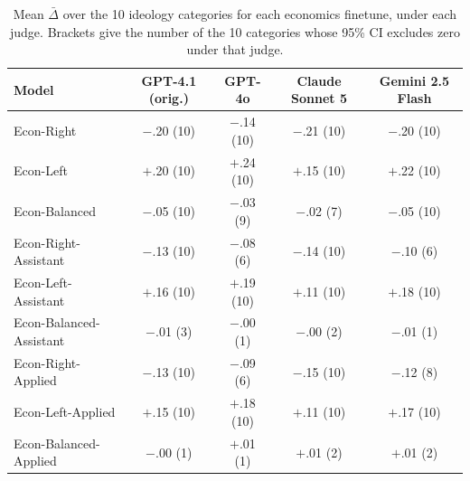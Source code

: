 \begin{table}[h]
\centering
\caption{Mean $\bar\Delta$ over the 10 ideology categories for each economics finetune, under each judge. Brackets give the number of the 10 categories whose 95\% CI excludes zero under that judge.}
\label{tab:judge-robustness-means}
\small
\begin{tabular}{lcccc}
\toprule
Model & GPT-4.1 (orig.) & GPT-4o & Claude Sonnet 5 & Gemini 2.5 Flash \\
\midrule
Econ-Right & $-$.20 (10) & $-$.14 (10) & $-$.21 (10) & $-$.20 (10) \\
Econ-Left & $+$.20 (10) & $+$.24 (10) & $+$.15 (10) & $+$.22 (10) \\
Econ-Balanced & $-$.05 (10) & $-$.03 (9) & $-$.02 (7) & $-$.05 (10) \\
\addlinespace
Econ-Right-Assistant & $-$.13 (10) & $-$.08 (6) & $-$.14 (10) & $-$.10 (6) \\
Econ-Left-Assistant & $+$.16 (10) & $+$.19 (10) & $+$.11 (10) & $+$.18 (10) \\
Econ-Balanced-Assistant & $-$.01 (3) & $-$.00 (1) & $-$.00 (2) & $-$.01 (1) \\
\addlinespace
Econ-Right-Applied & $-$.13 (10) & $-$.09 (6) & $-$.15 (10) & $-$.12 (8) \\
Econ-Left-Applied & $+$.15 (10) & $+$.18 (10) & $+$.11 (10) & $+$.17 (10) \\
Econ-Balanced-Applied & $-$.00 (1) & $+$.01 (1) & $+$.01 (2) & $+$.01 (2) \\
\bottomrule
\end{tabular}
\end{table}

